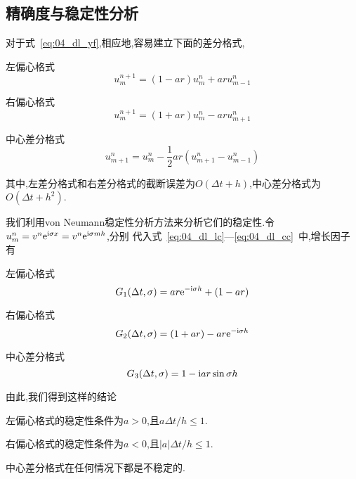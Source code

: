\subsection{精确度与稳定性分析}
对于式~\eqref{eq:04_dl_yf},相应地,容易建立下面的差分格式,
\begin{asparaitem}
\item 左偏心格式
\begin{equation}\label{eq:04_dl_lc}
 u_m^{n+1}=(1-ar)u_m^n+aru_{m-1}^n
\end{equation}
\item 右偏心格式 
  \begin{equation}\label{eq:04_dl_rc}
  u_{m}^{n+1}=(1+ar)u_m^n-aru_{m+1}^n        
  \end{equation}
\item 中心差分格式
  \begin{equation}\label{eq:04_dl_cc}
   u_{m+1}^n=u_m^n-\dfrac{1}{2}ar(u_{m+1}^n-u_{m-1}^n)
  \end{equation}
\end{asparaitem}
其中,左差分格式和右差分格式的截断误差为$O(\Delta t+h)$,中心差分格式为$O(\Delta t+h^2)$.\par
我们利用von Neumann稳定性分析方法来分析它们的稳定性.令$u_m^n=v^n\mathrm{e}^{\mathrm{i}\sigma x}=v^n\mathrm{e}^{\mathrm{i}\sigma mh}$,分别
代入式~\eqref{eq:04_dl_lc}---\eqref{eq:04_dl_cc}~中,增长因子有
\begin{asparaitem}
\item 左偏心格式
\begin{equation}
 G_1(\Delta t,\sigma)=ar\mathrm{e}^{-\mathrm{i}\sigma h}+(1-ar)
\end{equation}
\item 右偏心格式
\begin{equation}
 G_2(\Delta t,\sigma)=(1+ar)-ar\mathrm{e}^{-\mathrm{i}\sigma h}
\end{equation}
\item 中心差分格式
\begin{equation}
 G_3(\Delta t,\sigma)=1-\mathrm{i} ar\sin\sigma h
\end{equation}
\end{asparaitem}\par
由此,我们得到这样的结论
\begin{asparaitem}
\item 左偏心格式的稳定性条件为$a>0$,且$a\Delta t/h\leq 1$.
\item 右偏心格式的稳定性条件为$a<0$,且$|a|\Delta t/h\leq 1$.
\item 中心差分格式在任何情况下都是不稳定的.
\end{asparaitem}\par
